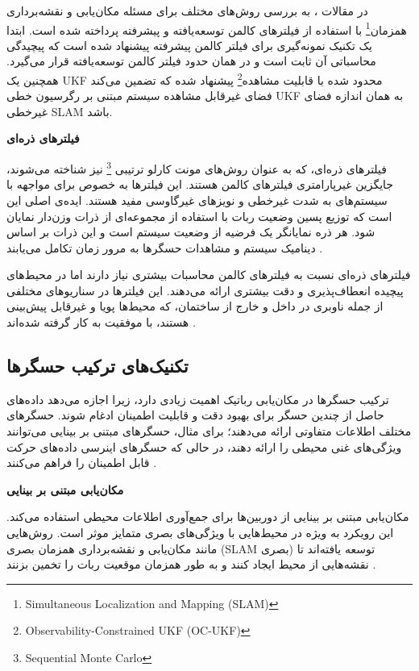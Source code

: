 
در مقالات 
\cite{huang2013quadratic, kim2008unscented, cheng2014compressed}
، به بررسی روش‌های مختلف برای مسئله مکان‌یابی و نقشه‌برداری همزمان\footnote{Simultaneous Localization and Mapping (SLAM)}
 با استفاده از فیلترهای کالمن توسعه‌یافته و پیشرفته پرداخته شده است. ابتدا یک تکنیک نمونه‌گیری برای فیلتر کالمن پیشرفته پیشنهاد شده است که پیچیدگی محاسباتی آن ثابت است و در همان حدود فیلتر کالمن توسعه‌یافته قرار می‌گیرد. همچنین یک UKF محدود شده با قابلیت مشاهده\footnote{Observability-Constrained UKF (OC-UKF)} پیشنهاد شده که تضمین می‌کند فضای غیرقابل مشاهده سیستم مبتنی بر رگرسیون خطی UKF به همان اندازه فضای غیرخطی SLAM باشد.
 

\textbf {فیلترهای ذره‌ای}

فیلترهای ذره‌ای، که به عنوان روش‌های مونت کارلو ترتیبی
\footnote{Sequential Monte Carlo}
 نیز شناخته می‌شوند، جایگزین غیرپارامتری فیلترهای کالمن هستند. این فیلترها به خصوص برای مواجهه با سیستم‌های به شدت غیرخطی و نویزهای غیرگاوسی مفید هستند. ایده‌ی اصلی این است که توزیع پسین وضعیت ربات با استفاده از مجموعه‌ای از ذرات وزن‌دار نمایان شود. هر ذره نمایانگر یک فرضیه از وضعیت سیستم است و این ذرات بر اساس دینامیک سیستم و مشاهدات حسگرها به مرور زمان تکامل می‌یابند
\cite{fox2001particle}.

فیلترهای ذره‌ای نسبت به فیلترهای کالمن محاسبات بیشتری نیاز دارند اما در محیط‌های پیچیده انعطاف‌پذیری و دقت بیشتری ارائه می‌دهند. این فیلترها در سناریوهای مختلفی از جمله ناوبری در داخل و خارج از ساختمان، که محیط‌ها پویا و غیرقابل پیش‌بینی هستند، با موفقیت به کار گرفته شده‌اند
 \cite{fox2001particle, montemerlo2002conditional, kwok2003adaptive}.

\subsection{تکنیک‌های ترکیب حسگرها}

ترکیب حسگرها در مکان‌یابی رباتیک اهمیت زیادی دارد، زیرا اجازه می‌دهد داده‌های حاصل از چندین حسگر برای بهبود دقت و قابلیت اطمینان ادغام شوند. حسگرهای مختلف اطلاعات متفاوتی ارائه می‌دهند؛ برای مثال، حسگرهای مبتنی بر بینایی می‌توانند ویژگی‌های غنی محیطی را ارائه دهند، در حالی که حسگرهای اینرسی داده‌های حرکت قابل اطمینان را فراهم می‌کنند
\cite{srinivasan2007multiple}.

\textbf{مکان‌یابی مبتنی بر بینایی}

مکان‌یابی مبتنی بر بینایی از دوربین‌ها برای جمع‌آوری اطلاعات محیطی استفاده می‌کند. این رویکرد به ویژه در محیط‌هایی با ویژگی‌های بصری متمایز موثر است. روش‌هایی مانند مکان‌یابی و نقشه‌برداری همزمان بصری (SLAM بصری) توسعه یافته‌اند تا نقشه‌هایی از محیط ایجاد کنند و به طور همزمان موقعیت ربات را تخمین بزنند
 \cite{westman2018underwater, hiebert2022introduction}.

